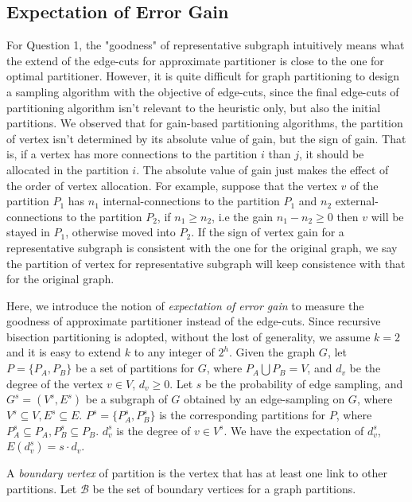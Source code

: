 \documentclass{sig-alternate-2013}
\begin{document}
\subsection{Expectation of Error Gain}
For Question 1, the "goodness" of representative subgraph intuitively means what the extend of the edge-cuts for approximate partitioner is close to the one for optimal partitioner. However, it is quite difficult for graph partitioning to design a sampling algorithm with the objective of edge-cuts, since the final edge-cuts of partitioning algorithm isn't relevant to the heuristic only, but also the initial partitions.
We observed that for gain-based partitioning algorithms, the partition of vertex isn't determined by its absolute value of gain, but the sign of gain. That is, if a vertex has more connections to the partition $i$ than $j$, it should be allocated in the partition $i$. The absolute value of gain just makes the effect of the order of vertex allocation.
For example, suppose that the vertex $v$ of the partition $P_1$ has $n_1$ internal-connections to the partition $P_1$ and $n_2$ external-connections to the partition $P_2$, if $n_1\geq n_2$, i.e the gain $n_1 - n_2 \geq 0$ then $v$ will be stayed in $P_1$, otherwise moved into $P_2$. If the sign of vertex gain for a representative subgraph is consistent with the one for the original graph, we say the partition of vertex for representative subgraph will keep consistence with that for the original graph.

Here, we introduce the notion of \textit{expectation of error gain} to measure the goodness of approximate partitioner instead of the edge-cuts.
Since recursive bisection partitioning is adopted, without the lost of generality, we assume $k = 2$ and it is easy to extend $k$ to any integer of $2^h$. Given the graph $G$, let $P=\{P_A,P_B\}$ be a set of partitions for $G$, where $P_A \bigcup P_B = V$, and $d_v$ be the degree of the vertex $v \in V$, $d_v \geq 0$. Let $s$ be the probability of edge sampling, and $G^s = (V^s, E^s)$ be a subgraph of $G$ obtained by an edge-sampling on $G$, where $V^s \subseteq V, E^s \subseteq E$. $P^s=\{P_A^s,P_B^s\}$ is the corresponding partitions for $P$, where $P_A^s \subseteq P_A, P_B^s \subseteq P_B$. $d_v^s$ is the degree of $v \in V^s$. We have the expectation of $d_v^s$, $E(d_v^s) = s\cdot d_v$.

\begin{definition}\label{def-boundary}
 A \textit{boundary vertex} of partition is the vertex that has at least one link to other partitions. Let $\mathcal{B}$ be the set of boundary vertices for a graph partitions.
\end{definition}
\end{document}
